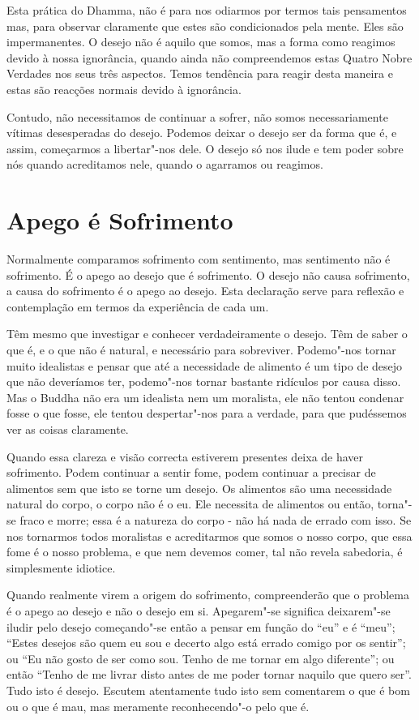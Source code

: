 Esta prática do Dhamma, não é para nos odiarmos por termos tais pensamentos mas,
para observar claramente que estes são condicionados pela mente. Eles são
impermanentes. O desejo não é aquilo que somos, mas a forma como reagimos devido
à nossa ignorância, quando ainda não compreendemos estas Quatro Nobre Verdades
nos seus três aspectos. Temos tendência para reagir desta maneira e estas são
reacções normais devido à ignorância.

Contudo, não necessitamos de continuar a sofrer, não somos necessariamente
vítimas desesperadas do desejo. Podemos deixar o desejo ser da forma que é, e
assim, começarmos a libertar"-nos dele. O desejo só nos ilude e tem poder sobre
nós quando acreditamos nele, quando o agarramos ou reagimos.

\section{Apego é Sofrimento}

Normalmente comparamos sofrimento com sentimento, mas sentimento não é
sofrimento. É o apego ao desejo que é sofrimento. O desejo não causa sofrimento,
a causa do sofrimento é o apego ao desejo. Esta declaração serve para reflexão e
contemplação em termos da experiência de cada um.

Têm mesmo que investigar e conhecer verdadeiramente o desejo. Têm de saber o que
é, e o que não é natural, e necessário para sobreviver. Podemo"-nos tornar muito
idealistas e pensar que até a necessidade de alimento é um tipo de desejo que
não deveríamos ter, podemo"-nos tornar bastante ridículos por causa disso. Mas o
Buddha não era um idealista nem um moralista, ele não tentou condenar fosse o
que fosse, ele tentou despertar"-nos para a verdade, para que pudéssemos ver as
coisas claramente.

Quando essa clareza e visão correcta estiverem presentes deixa de haver
sofrimento. Podem continuar a sentir fome, podem continuar a precisar de
alimentos sem que isto se torne um desejo. Os alimentos são uma necessidade
natural do corpo, o corpo não é o eu. Ele necessita de alimentos ou então,
torna"-se fraco e morre; essa é a natureza do corpo - não há nada de errado com
isso. Se nos tornarmos todos moralistas e acreditarmos que somos o nosso corpo,
que essa fome é o nosso problema, e que nem devemos comer, tal não revela
sabedoria, é simplesmente idiotice.

Quando realmente virem a origem do sofrimento, compreenderão que o problema é o
apego ao desejo e não o desejo em si. Apegarem"-se significa deixarem"-se iludir
pelo desejo começando"-se então a pensar em função do “eu” e é “meu”; “Estes
desejos são quem eu sou e decerto algo está errado comigo por os sentir”; ou “Eu
não gosto de ser como sou. Tenho de me tornar em algo diferente”; ou então
“Tenho de me livrar disto antes de me poder tornar naquilo que quero ser”. Tudo
isto é desejo. Escutem atentamente tudo isto sem comentarem o que é bom ou o que
é mau, mas meramente reconhecendo"-o pelo que é.

